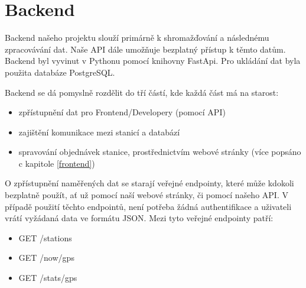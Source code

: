 \section{Backend}
Backend našeho projektu slouží primárně k shromažďování a následnému zpracovávání dat. Naše API dále umožňuje bezplatný přístup k těmto datům.
Backend byl vyvinut v Pythonu pomocí knihovny FastApi. Pro ukládání dat byla použita databáze PostgreSQL.

Backend se dá pomyslně rozdělit do tří částí, kde každá část má na starost: 
\begin{itemize}
  \item zpřístupnění dat pro Frontend/Developery (pomocí API) 
  \item zajištění komunikace mezi stanicí a databází 
  \item spravování objednávek stanice, prostřednictvím webové stránky (více popsáno c kapitole \ref{frontend})  
\end{itemize}

O zpřístupnění naměřených dat se starají veřejné endpointy, které může kdokoli bezplatně použít, ať už pomocí naší webové stránky, či pomocí našeho API. 
V případě použití těchto endpointů, není potřeba žádná authentifikace a uživateli vrátí vyžádaná data ve formátu JSON. Mezi tyto veřejné endpointy patří:
\begin{itemize}
  \item GET /stations
  \item GET /now/{gps} 
  \item GET /stats/{gps}
\end{itemize}

